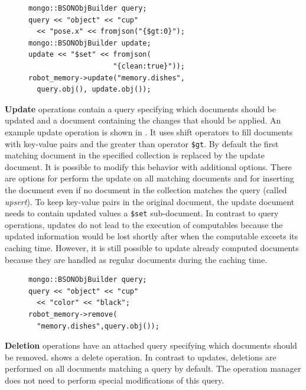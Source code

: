 \begin{figure}
  \vspace{-0.4cm}
\begin{lstlisting}[style=SmallCpp,
  caption={Update operation to mark one cup in an area as clean},
  label=lst:impl-update,
  framexleftmargin=5pt, xleftmargin=0pt,
 morekeywords={}, numbers=none]
mongo::BSONObjBuilder query;
query << "object" << "cup"
  << "pose.x" << fromjson("{$gt:0}");
mongo::BSONObjBuilder update;
update << "$set" << fromjson(
                    "{clean:true}"));
robot_memory->update("memory.dishes",
  query.obj(), update.obj());
\end{lstlisting}%
\vspace{-8mm}
\end{figure}
\textbf{Update} operations contain a query specifying which documents
should be updated and a document containing the changes that should be
applied. An example update operation is shown in
. It uses shift operators to fill documents
with key-value pairs and the greater than operator \texttt{\$gt}.
By default the first matching document in the specified
collection is replaced by the update document. It is possible to
modify this behavior with additional options. There are options for
perform the update on all matching documents and for inserting the
document even if no document in the collection matches the query
(called \emph{upsert}). To keep key-value pairs in the original
document, the update document needs to contain updated values a
\texttt{\$set} sub-document. In contrast to
query operations, updates do not lead to the execution of computables
because the updated information would be lost shortly after when the computable
exceets its caching time. However, it is still possible to update
already computed documents because they are handled as regular
documents during the caching time.

\begin{figure}
  \vspace{-0.4cm}
\begin{lstlisting}[style=SmallCpp,
  caption={Deletion of all black cups},
  label=lst:impl-delete,
  framexleftmargin=5pt, xleftmargin=0pt,
 morekeywords={}, numbers=none]
mongo::BSONObjBuilder query;
query << "object" << "cup"
  << "color" << "black";
robot_memory->remove(
  "memory.dishes",query.obj());
\end{lstlisting}
\vspace{-8mm}
\end{figure}
\textbf{Deletion} operations have an attached query specifying which
documents should be removed.  shows a delete
operation. In contrast to updates, deletions are performed on all
documents matching a query by default.  The operation manager does not
need to perform special modifications of this query.


